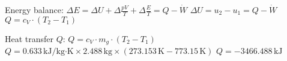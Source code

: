 Energy balance:  
\( \Delta E = \Delta U + \Delta \frac{pV}{T} + \Delta \frac{E}{T} = Q - \dot{W} \)  
\( \Delta U = u_2 - u_1 = Q - \dot{W} \)  
\( Q = c_V \cdot (T_2 - T_1) \)  

Heat transfer \( Q \):  
\( Q = c_V \cdot m_g \cdot (T_2 - T_1) \)  
\( Q = 0.633 \, \text{kJ/kg·K} \times 2.488 \, \text{kg} \times (273.153 \, \text{K} - 773.15 \, \text{K}) \)  
\( Q = -3466.488 \, \text{kJ} \)